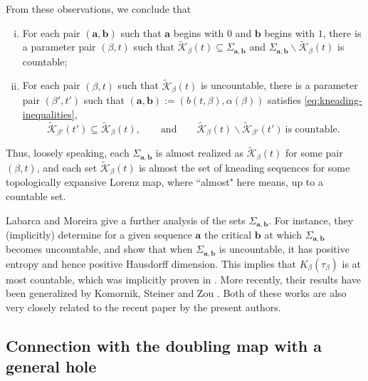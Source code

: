\documentclass[11pt]{amsart}
\theoremstyle{definition}
\theoremstyle{remark}
\numberwithin{equation}{section}
\newcommand{\Kt}{\widetilde{\mathcal{K}}}
\renewcommand{\a}{ {\mathbf{a}}}
\renewcommand{\b}{ {\mathbf{b}}}
\newcommand{\al}{\alpha}
\renewcommand{\a}{ \mathbf{a}}
\begin{document}
From these observations, we conclude that
\begin{enumerate}[(i)]
\item For each pair $(\a,\b)$ such that $\a$ begins with $0$ and $\b$ begins with $1$, there is a parameter pair $(\beta,t)$ such that $\Kt_\beta(t)\subseteq\Sigma_{\a,\b}$ and $\Sigma_{\a,\b}\backslash \Kt_\beta(t)$ is countable;
\item For each pair $(\beta,t)$ such that $\Kt_\beta(t)$ is uncountable, there is a parameter pair $(\beta',t')$ such that $(\a,\b):=(b(t,\beta),\al(\beta))$ satisfies \eqref{eq:kneading-inequalities},
\[
\Kt_{\beta'}(t')\subseteq \Kt_\beta(t), \qquad\mbox{and} \qquad \Kt_\beta(t)\backslash\Kt_{\beta'}(t')\ \mbox{is countable}.
\]
\end{enumerate}
Thus, loosely speaking, each $\Sigma_{\a,\b}$ is almost realized as $\Kt_\beta(t)$ for some pair $(\beta,t)$, and each set $\Kt_\beta(t)$ is almost  the set of kneading sequences for some topologically expansive Lorenz map, where ``almost" here means, up to a countable set.

Labarca and Moreira \cite{Labarca-Moreira-2006} give a further analysis of the sets $\Sigma_{\a,\b}$. For instance, they (implicitly) determine for a given sequence $\a$ the critical $\b$ at which $\Sigma_{\a,\b}$ becomes uncountable, and show that when $\Sigma_{\a,\b}$ is uncountable, it has positive entropy and hence positive Hausdorff dimension. {This implies that $K_\beta(\tau_\beta)$ is at most countable, which was implicitly proven in \cite{Allaart-Kong-2022}.}  More recently, their results have been generalized by Komornik, Steiner and Zou \cite{Komornik-Steiner-Zou-2022}. Both of these works are also very closely related to the recent paper \cite{Allaart-Kong-2021} by the present authors.


\subsection{Connection with the doubling map with a general hole}
\end{document}
